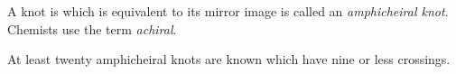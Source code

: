 \documentclass[12pt]{article}
\begin{document}
A  knot is which is equivalent to its mirror image  is called an {\em amphicheiral knot}. Chemists use the term \emph{achiral}.

At least twenty amphicheiral knots are known which have nine or less crossings.
\end{document}
